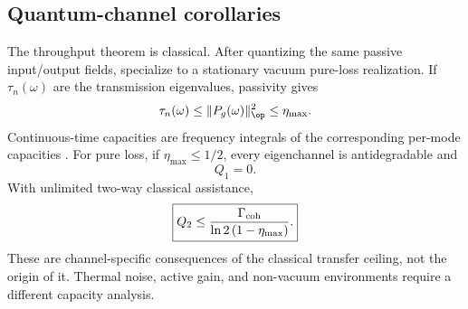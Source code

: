 \subsection{Quantum-channel corollaries}

The throughput theorem is classical. After quantizing the same passive input/output fields, specialize to a stationary vacuum pure-loss realization. If $\tau_n(\omega)$ are the transmission eigenvalues, passivity gives
\begin{equation}
\tau_n(\omega)\le\|P_g(\omega)\|_{\op}^2\le\eta_{\max}.
\label{eq:taumax}
\end{equation}
Continuous-time capacities are frequency integrals of the corresponding per-mode capacities \cite{WangLiJiang2022}. For pure loss, if $\eta_{\max}\le1/2$, every eigenchannel is antidegradable and
\begin{equation}
\boxed{Q_1=0.}
\label{eq:Q1zero}
\end{equation}
With unlimited two-way classical assistance,
\begin{equation}
\boxed{
Q_2\le
\frac{\Gamma_{\rm coh}}
{\ln2\,(1-\eta_{\max})}.}
\label{eq:Q2bound}
\end{equation}
These are channel-specific consequences of the classical transfer ceiling, not the origin of it. Thermal noise, active gain, and non-vacuum environments require a different capacity analysis.